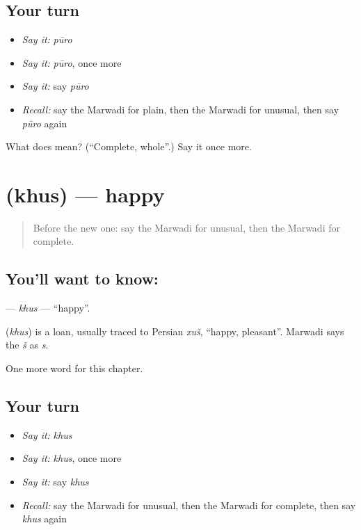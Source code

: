 \subsection*{Your turn}
\begin{itemize}
\raggedright
  \item \emph{Say it:} \emph{pūro}
  \item \emph{Say it:} \emph{pūro}, once more
  \item \emph{Say it:} say \emph{pūro}
  \item \emph{Recall:} say the Marwadi for plain, then the Marwadi for unusual, then say \emph{pūro} again
\end{itemize}

\begin{tcolorbox}[breakable,colback=teal!4,colframe=teal!35!black,title={Before you move on}]
What does  mean? (\textquotedblleft{}Complete, whole\textquotedblright{}.) Say it once more.
\end{tcolorbox}
\section[\texorpdfstring{\mw{खुस} (khus)}{खुस (khus)}]{ (khus) — happy}

\label{lesson:MW-C149-khus}



\begin{quote}
Before the new one: say the Marwadi for unusual, then the Marwadi for complete.
\end{quote}

\subsection*{You'll want to know: }
\textbf{} — \emph{khus} — \textquotedblleft{}happy\textquotedblright{}.

\begin{cousinweb}
\textbf{} (\emph{khus}) is a loan, usually traced to Persian \emph{xuš}, \textquotedblleft{}happy, pleasant\textquotedblright{}. Marwadi says the \emph{š} as \emph{s}.
\end{cousinweb}

\begin{grammarlens}[title={What you've built}]
One more word for this chapter.
\end{grammarlens}

\subsection*{Your turn}
\begin{itemize}
\raggedright
  \item \emph{Say it:} \emph{khus}
  \item \emph{Say it:} \emph{khus}, once more
  \item \emph{Say it:} say \emph{khus}
  \item \emph{Recall:} say the Marwadi for unusual, then the Marwadi for complete, then say \emph{khus} again
\end{itemize}

